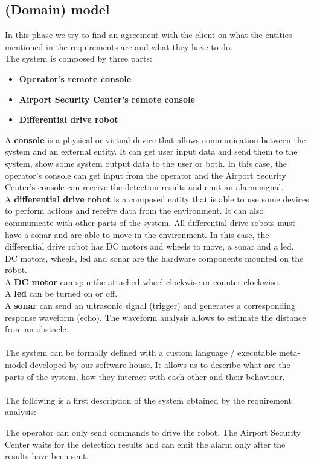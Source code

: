 \documentclass{llncs}
\newcommand{\labelssec}[1]{\label{ssec:#1}}
\begin{document}
\subsection{(Domain) model}
\labelssec{Domain model}
In this phase we try to find an agreement with the client on what the entities mentioned in the requirements are and what they have to do.\\The system is composed by three parts:
\begin{itemize}
\item \textbf{Operator's remote console}
\item \textbf{Airport Security Center's remote console}
\item \textbf{Differential drive robot}
\end{itemize}
A \textbf{console} is a physical or virtual device that allows communication between the system and an external entity. It can get user input data and send them to the system, show some system output data to the user or both. In this case, the operator's console can get input from the operator and the Airport Security Center's console can receive the detection results and emit an alarm signal.
\\A \textbf{differential drive robot} is a composed entity that is able to use some devices to perform actions and receive data from the environment. It can also communicate with other parts of the system. All differential drive robots must have a sonar and are able to move in the environment. In this case, the differential drive robot has DC motors and wheels to move, a sonar and a led.
DC motors, wheels, led and sonar are the hardware components mounted on the robot.
\\A \textbf{DC motor} can spin the attached wheel clockwise or counter-clockwise.
\\A \textbf{led} can be turned on or off.
\\A \textbf{sonar} can send an ultrasonic signal (trigger) and generates a corresponding response waveform (echo). The waveform analysis allows to estimate the distance from an obstacle.\\ \\
The system can be formally defined with a custom language / executable meta-model developed by our software house. It allows us to describe what are the parts of the system, how they interact with each other and their behaviour. \\ \\
The following is a first description of the system obtained by the requirement analysis:

The operator can only send commands to drive the robot.
The Airport Security Center waits for the detection results and can emit the alarm only after the results have been sent.
\end{document}
